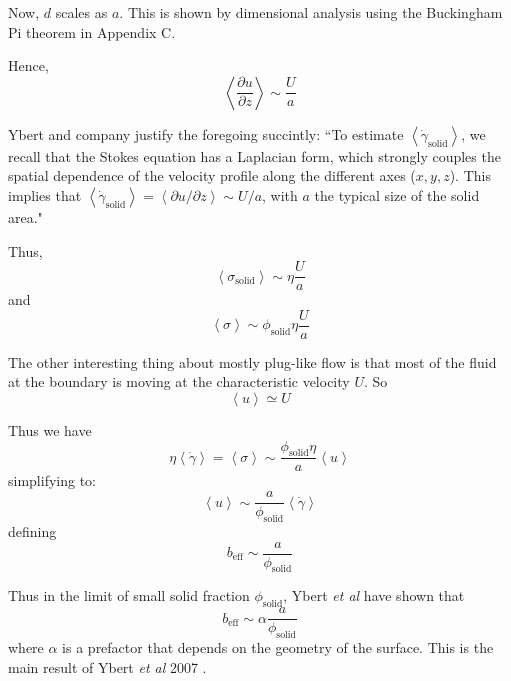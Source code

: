 \documentclass[12pt, a4paper, twoside, openright]{book}
\newcommand{\beff}{\ensuremath{b_{\mathrm{eff}}}}
\newcommand{\phisol}{\ensuremath{\phi_{\mathrm{solid}}}}
\newcommand{\sigsol}{\ensuremath{\sigma_{\mathrm{solid}}}}
\newcommand{\gamsol}{\ensuremath{ \dot{\gamma}_{\mathrm{solid}} }}
\begin{document}
Now, $d$ scales as $a$.  This is shown by dimensional analysis using the Buckingham Pi theorem in Appendix C.

Hence,
\begin{equation}
\left< \frac{\partial u}{\partial z} \right> \sim \frac{U}{a}
\end{equation}

Ybert and company justify the foregoing succintly: ``To estimate $ \left< \gamsol \right> $, we recall that the Stokes equation has a Laplacian form, which strongly couples the spatial dependence of the velocity profile along the different axes ($x,y,z$). This implies that $ \left< \gamsol \right> = \left< \partial u / \partial z \right> \sim U/a $, with $a$ the typical size of the solid area."

Thus, 
\begin{equation}
\left< \sigsol \right> \sim \eta \frac{U}{a}
\end{equation}
and
\begin{equation}
\left< \sigma \right> \sim \phisol \eta \frac{U}{a}
\end{equation}

The other interesting thing about mostly plug-like flow is that most of the fluid at the boundary is moving at the characteristic velocity $U$. So
\begin{equation}
\left< u \right> \simeq U
\end{equation}

Thus we have
\begin{equation}
\eta \left< \dot{\gamma} \right> = \left< \sigma \right> \sim
  \frac{ \phisol \eta} {a} \left< u \right>
\end{equation}
simplifying to:
\begin{equation}
\left< u \right> \sim \frac{a}{\phisol}  \left< \dot{\gamma} \right>
\end{equation}
defining
\begin{equation}
\beff \sim  \frac{a}{\phisol} 
\end{equation}

Thus in the limit of small solid fraction $\phisol$, Ybert \emph{et al} have shown that
\begin{equation}
\beff \sim \alpha  \frac{a}{\phisol} 
\end{equation}
where $\alpha$ is a prefactor that depends on the geometry of the surface.  This is the main result of Ybert \emph{et al} 2007 \cite{Ybert2007}.

\clearpage
\end{document}
